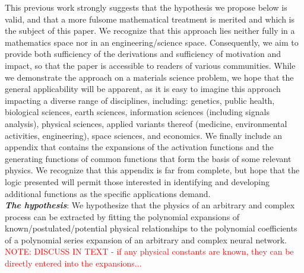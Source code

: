 This previous work strongly suggests that the hypothesis we propose below is valid, and that a more fulsome mathematical treatment is merited and which is the subject of this paper.  We recognize that this approach lies neither fully in a mathematics space nor in an engineering/science space. Consequently, we aim to provide both sufficiency of the derivations and sufficiency of motivation and impact, so that the paper is accessible to readers of various communities.  While we demonstrate the approach on a materials science problem, we hope that the general applicability will be apparent, as it is easy to imagine this approach impacting a diverse range of disciplines, including: genetics, public health, biological sciences, earth sciences, information sciences (including signals analysis), physical sciences, applied variants thereof (medicine, environmental activities, engineering), space sciences, and economics.  We finally include an appendix that contains the expansions of the activation functions and the generating functions of common functions that form the basis of some relevant physics.  We recognize that this appendix is far from complete, but hope that the logic presented will permit those interested in identifying and developing additional functions as the specific applications demand.\\

\textbf{\textit{The hypothesis}}: We hypothesize that the physics of an arbitrary and complex process can be extracted by fitting the polynomial expansions of known/postulated/potential physical relationships to the polynomial coefficients of a polynomial series expansion of an arbitrary and complex neural network.\\

\textcolor{red}{NOTE:  DISCUSS IN TEXT - if any physical constants are known, they can be directly entered into the expansions...}



